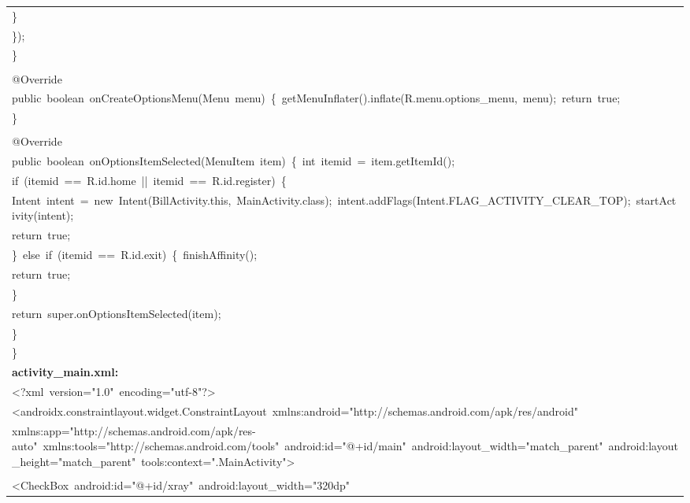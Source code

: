 \documentclass[a4paper,12pt]{article}
\begin{document}
\begin{longtable}{|p{}|}
{\ttfamily\small \}} \\
{\ttfamily\small \});} \\
{\ttfamily\small \}} \\
\strut \\
{\ttfamily\small @Override} \\
{\ttfamily\small public\ boolean\ onCreateOptionsMenu(Menu\ menu)\ \{\ getMenuInflater().inflate(R.menu.options\_menu,\ menu);\ return\ true;} \\
{\ttfamily\small \}} \\
\strut \\
{\ttfamily\small @Override} \\
{\ttfamily\small public\ boolean\ onOptionsItemSelected(MenuItem\ item)\ \{\ int\ itemid\ =\ item.getItemId();} \\
{\ttfamily\small if\ (itemid\ ==\ R.id.home\ ||\ itemid\ ==\ R.id.register)\ \{} \\
{\ttfamily\small Intent\ intent\ =\ new\ Intent(BillActivity.this,\ MainActivity.class);\ intent.addFlags(Intent.FLAG\_ACTIVITY\_CLEAR\_TOP);\ startActivity(intent);} \\
{\ttfamily\small return\ true;} \\
{\ttfamily\small \}\ else\ if\ (itemid\ ==\ R.id.exit)\ \{\ finishAffinity();} \\
{\ttfamily\small return\ true;} \\
{\ttfamily\small \}} \\
{\ttfamily\small return\ super.onOptionsItemSelected(item);} \\
{\ttfamily\small \}} \\
{\ttfamily\small \}} \\
\hline
\rule{0pt}{13pt}\textbf{activity\_main.xml:} \\
\hline
{\ttfamily\small \textless{}?xml\ version="1.0"\ encoding="utf-8"?\textgreater{}} \\
{\ttfamily\small \textless{}androidx.constraintlayout.widget.ConstraintLayout\ xmlns:android="http://schemas.android.com/apk/res/android"} \\
{\ttfamily\small xmlns:app="http://schemas.android.com/apk/res-auto"\ xmlns:tools="http://schemas.android.com/tools"\ android:id="@+id/main"\ android:layout\_width="match\_parent"\ android:layout\_height="match\_parent"\ tools:context=".MainActivity"\textgreater{}} \\
\strut \\
{\ttfamily\small \textless{}CheckBox\ android:id="@+id/xray"\ android:layout\_width="320dp"} \\

\end{longtable}
\end{document}
